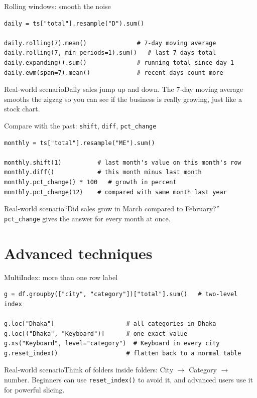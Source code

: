 \documentclass[aspectratio=169,10pt]{beamer}
\newcommand{\code}[1]{\texttt{#1}}
\newcommand{\scenario}[1]{\begin{exampleblock}{Real-world scenario}#1\end{exampleblock}}
\begin{document}
\begin{frame}[fragile]{Rolling windows: smooth the noise}
\begin{lstlisting}
daily = ts["total"].resample("D").sum()

daily.rolling(7).mean()              # 7-day moving average
daily.rolling(7, min_periods=1).sum()   # last 7 days total
daily.expanding().sum()              # running total since day 1
daily.ewm(span=7).mean()             # recent days count more
\end{lstlisting}
  \scenario{Daily sales jump up and down. The 7-day moving average smooths the zigzag so you
  can see if the business is really growing, just like a stock chart.}
\end{frame}

\begin{frame}[fragile]{Compare with the past: \texttt{shift}, \texttt{diff}, \texttt{pct\_change}}
\begin{lstlisting}
monthly = ts["total"].resample("ME").sum()

monthly.shift(1)          # last month's value on this month's row
monthly.diff()            # this month minus last month
monthly.pct_change() * 100   # growth in percent
monthly.pct_change(12)    # compared with same month last year
\end{lstlisting}
  \scenario{``Did sales grow in March compared to February?'' \code{pct\_change} gives the
  answer for every month at once.}
\end{frame}

\section{Advanced techniques}

\begin{frame}[fragile]{MultiIndex: more than one row label}
\begin{lstlisting}
g = df.groupby(["city", "category"])["total"].sum()   # two-level index

g.loc["Dhaka"]                    # all categories in Dhaka
g.loc[("Dhaka", "Keyboard")]      # one exact value
g.xs("Keyboard", level="category")  # Keyboard in every city
g.reset_index()                   # flatten back to a normal table
\end{lstlisting}
  \scenario{Think of folders inside folders: City $\rightarrow$ Category $\rightarrow$ number.
  Beginners can use \code{reset\_index()} to avoid it, and advanced users use it for
  powerful slicing.}
\end{frame}
\end{document}
